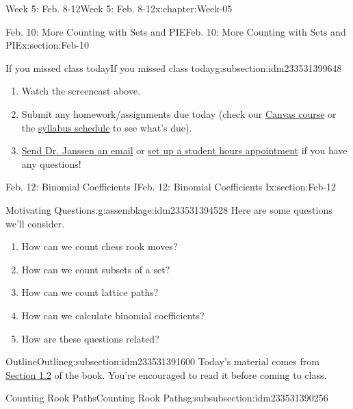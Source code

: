 \documentclass[oneside,10pt,]{book}
\numberwithin{equation}{section}
\begin{document}
\begin{chapterptx}{Week 5: Feb. 8-12}{}{Week 5: Feb. 8-12}{}{}{x:chapter:Week-05}
\begin{sectionptx}{Feb. 10: More Counting with Sets and PIE}{}{Feb. 10: More Counting with Sets and PIE}{}{}{x:section:Feb-10}
\begin{subsectionptx}{If you missed class today}{}{If you missed class today}{}{}{g:subsection:idm233531399648}
\begin{enumerate}
\item{}Watch the screencast above.%
\item{}Submit any homework\slash{}assignments due today (check our \href{https://dordt.instructure.com/courses/3110050}{Canvas course} or the \href{https://prof.mkjanssen.org/ds/index.html\#schedule}{syllabus schedule} to see what's due).%
\item{}\href{mailto:mike.janssen@dordt.edu}{Send Dr. Janssen an email} or \href{https://calendly.com/mkjanssen/student-hours}{set up a student hours appointment} if you have any questions!%
\end{enumerate}
\end{subsectionptx}
\end{sectionptx}
%
%
\typeout{************************************************}
\typeout{************************************************}
%
\begin{sectionptx}{Feb. 12: Binomial Coefficients I}{}{Feb. 12: Binomial Coefficients I}{}{}{x:section:Feb-12}
\begin{introduction}{}%
\begin{assemblage}{Motivating Questions.}{g:assemblage:idm233531394528}%
Here are some questions we'll consider. %
\begin{enumerate}
\item{}How can we count chess rook moves?%
\item{}How can we count subsets of a set?%
\item{}How can we count lattice paths?%
\item{}How can we calculate binomial coefficients?%
\item{}How are these questions related?%
\end{enumerate}
%
\end{assemblage}
\end{introduction}%
%
%
\typeout{************************************************}
\typeout{************************************************}
%
\begin{subsectionptx}{Outline}{}{Outline}{}{}{g:subsection:idm233531391600}
Today's material comes from \href{http://discrete.openmathbooks.org/dmoi3/sec_counting-binom.html}{Section 1.2} of the book. You're encouraged to read it before coming to class.%
%
%
\typeout{************************************************}
\typeout{************************************************}
%
\begin{subsubsectionptx}{Counting Rook Paths}{}{Counting Rook Paths}{}{}{g:subsubsection:idm233531390256}

\end{subsubsectionptx}
\end{subsectionptx}
\end{sectionptx}
\end{chapterptx}
\end{document}
